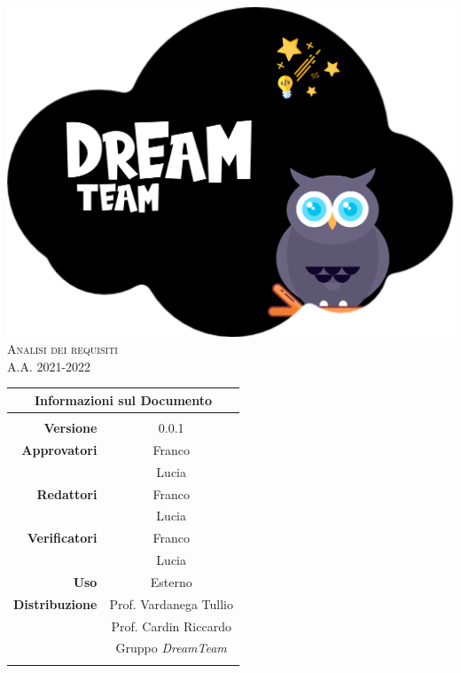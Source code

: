 \thispagestyle{empty}
\begin{titlepage}
	\begin{center}
		
		\includegraphics[scale = 0.05]{../latex/images/DreamTeam.png}\\[1.5cm]
\Huge \textsc{Analisi dei requisiti \doctitle{}}\\ [0.75cm]                          
\Large \textsf{A.A. 2021-2022} \\ [1cm]

\begin{table}[htbp]
\centering
\begin{tabular}{r|c}
\multicolumn{2}{c}{\textbf{Informazioni sul Documento}} \\
\hline \\
\textbf{Versione} & 0.0.1 \\ \rule{0pt}{3ex}    
\textbf{Approvatori} & Franco \\ \rule{0pt}{2ex}   
& Lucia \\ \rule{0pt}{3ex}    
\textbf{Redattori} & Franco \\ \rule{0pt}{2ex}   
& Lucia \\ \rule{0pt}{3ex}    
\textbf{Verificatori} & Franco \\ \rule{0pt}{2ex}   
& Lucia \\ \rule{0pt}{3ex}    
\textbf{Uso} & Esterno \\ \rule{0pt}{3ex}    
\textbf{Distribuzione} & Prof. Vardanega Tullio \\ \rule{0pt}{2ex}   
& Prof. Cardin Riccardo \\ \rule{0pt}{2ex}   
& Gruppo \textit{DreamTeam} \\ \rule{0pt}{0.1cm}   
\end{tabular} \\ [0.5cm]
\end{table}
  

\end{center}
\end{titlepage}
